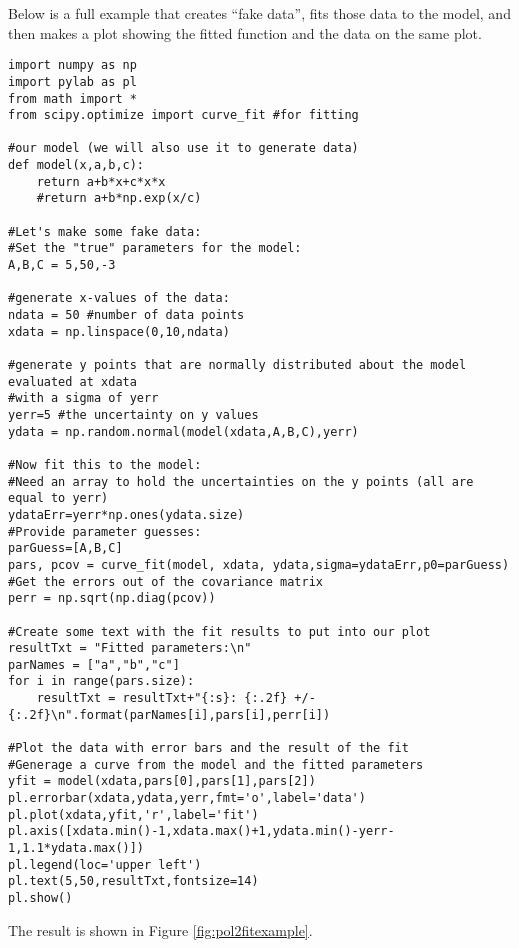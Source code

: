 Below is a full example that creates ``fake data'', fits those data to the model, and then makes a plot showing the fitted function and the data on the same plot.
\begin{lstlisting}[frame=single] 
import numpy as np
import pylab as pl
from math import *
from scipy.optimize import curve_fit #for fitting

#our model (we will also use it to generate data)
def model(x,a,b,c):
    return a+b*x+c*x*x
    #return a+b*np.exp(x/c)
    
#Let's make some fake data:
#Set the "true" parameters for the model:
A,B,C = 5,50,-3

#generate x-values of the data:
ndata = 50 #number of data points
xdata = np.linspace(0,10,ndata)

#generate y points that are normally distributed about the model evaluated at xdata
#with a sigma of yerr
yerr=5 #the uncertainty on y values
ydata = np.random.normal(model(xdata,A,B,C),yerr)

#Now fit this to the model:
#Need an array to hold the uncertainties on the y points (all are equal to yerr)
ydataErr=yerr*np.ones(ydata.size)
#Provide parameter guesses:
parGuess=[A,B,C]
pars, pcov = curve_fit(model, xdata, ydata,sigma=ydataErr,p0=parGuess)
#Get the errors out of the covariance matrix
perr = np.sqrt(np.diag(pcov))

#Create some text with the fit results to put into our plot
resultTxt = "Fitted parameters:\n"
parNames = ["a","b","c"]
for i in range(pars.size):
    resultTxt = resultTxt+"{:s}: {:.2f} +/- {:.2f}\n".format(parNames[i],pars[i],perr[i])

#Plot the data with error bars and the result of the fit
#Generage a curve from the model and the fitted parameters
yfit = model(xdata,pars[0],pars[1],pars[2])
pl.errorbar(xdata,ydata,yerr,fmt='o',label='data')
pl.plot(xdata,yfit,'r',label='fit')
pl.axis([xdata.min()-1,xdata.max()+1,ydata.min()-yerr-1,1.1*ydata.max()])
pl.legend(loc='upper left')
pl.text(5,50,resultTxt,fontsize=14)
pl.show()
\end{lstlisting}
The result is shown in Figure \ref{fig:pol2fitexample}.

 